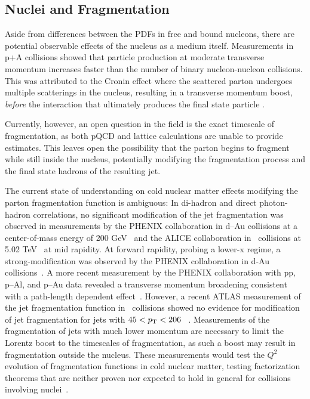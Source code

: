 \subsection{Nuclei and Fragmentation}

Aside from differences between the PDFs in free and bound nucleons, there are potential observable effects of the nucleus as a medium itself. Measurements in p+A collisions showed that particle production at moderate transverse momentum increases faster than the number of binary nucleon-nucleon collisions. This was attributed to the Cronin effect where the scattered parton undergoes multiple scatterings in the nucleus, resulting in a transverse momentum boost, \textit{before} the interaction that ultimately produces the final state particle \cite{Cronin1975}.

Currently, however, an open question in the field is the exact timescale of fragmentation, as both pQCD and lattice calculations are unable to provide estimates. This leaves open the possibility that the parton begins to fragment while still inside the nucleus, potentially modifying the fragmentation process and the final state hadrons of the resulting jet.


The current state of understanding on cold nuclear matter effects modifying the parton fragmentation function is ambiguous: In di-hadron and direct photon-hadron correlations, no significant modification of the jet fragmentation was observed in measurements by the PHENIX collaboration in d--Au collisions at a center-of-mass energy of 200 GeV~\cite{Adler:2005ad} and the ALICE collaboration in \pPb~collisions at 5.02 TeV~\cite{Acharya:2018edi,Adam:2015xea} at mid rapidity. At forward rapidity, probing a lower-x regime, a strong-modification was observed by the PHENIX collaboration in d-Au collisions~\cite{Adare:2011sc}. A more recent measurement by the PHENIX collaboration with pp, p--Al, and p--Au data revealed a transverse momentum broadening consistent with a path-length dependent effect~\cite{Aidala:2018eqn}. However, a recent ATLAS measurement of the jet fragmentation function in \pPb~collisions showed no evidence for modification of jet fragmentation for jets with $45<p_{\mathrm{T}}<206$ \GeVc~\cite{Aaboud:2017tke}. Measurements of the fragmentation of jets with much lower momentum are necessary to limit the Lorentz boost to the timescales of fragmentation, as such a boost may result in fragmentation outside the nucleus. These measurements would test the $Q^{2}$ evolution of fragmentation functions in cold nuclear matter, testing factorization theorems that are neither proven nor expected to hold in general for collisions involving nuclei~\cite{deFlorian:2011fp}. 


